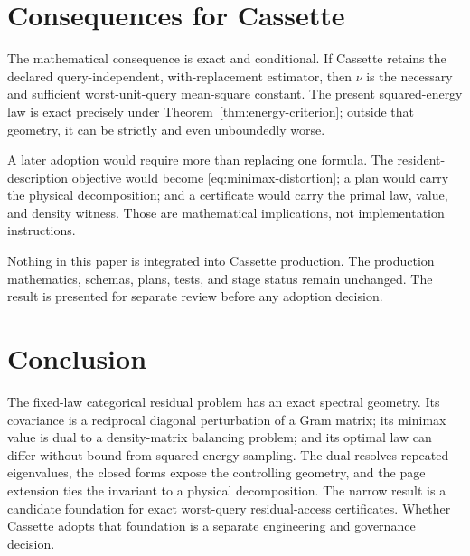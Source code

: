 \documentclass[11pt]{article}
\theoremstyle{definition}
\begin{document}
\section{Consequences for Cassette}

The mathematical consequence is exact and conditional.  If Cassette retains the declared
query-independent, with-replacement estimator, then $\nu$ is the necessary and sufficient
worst-unit-query mean-square constant.  The present squared-energy law is exact precisely under
Theorem~\ref{thm:energy-criterion}; outside that geometry, it can be strictly and even
unboundedly worse.

A later adoption would require more than replacing one formula.  The resident-description
objective would become \eqref{eq:minimax-distortion}; a plan would carry the physical decomposition;
and a certificate would carry the primal law, value, and density witness.  Those are mathematical
implications, not implementation instructions.

Nothing in this paper is integrated into Cassette production.  The production mathematics,
schemas, plans, tests, and stage status remain unchanged.  The result is presented for separate
review before any adoption decision.

\section{Conclusion}

The fixed-law categorical residual problem has an exact spectral geometry.  Its covariance is a
reciprocal diagonal perturbation of a Gram matrix; its minimax value is dual to a density-matrix
balancing problem; and its optimal law can differ without bound from squared-energy sampling.
The dual resolves repeated eigenvalues, the closed forms expose the controlling geometry, and the
page extension ties the invariant to a physical decomposition.  The narrow result is a candidate
foundation for exact worst-query residual-access certificates.  Whether Cassette adopts that
foundation is a separate engineering and governance decision.
\end{document}
